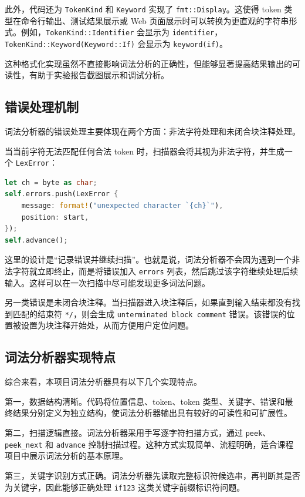 \documentclass[UTF8,a4paper,12pt]{ctexart}
\begin{document}
此外，代码还为 \texttt{TokenKind} 和 \texttt{Keyword} 实现了 \texttt{fmt::Display}。这使得 token 类型在命令行输出、测试结果展示或 Web 页面展示时可以转换为更直观的字符串形式。例如，\texttt{TokenKind::Identifier} 会显示为 \texttt{identifier}，\texttt{TokenKind::Keyword(Keyword::If)} 会显示为 \texttt{keyword(if)}。

这种格式化实现虽然不直接影响词法分析的正确性，但能够显著提高结果输出的可读性，有助于实验报告截图展示和调试分析。

\subsection{错误处理机制}

词法分析器的错误处理主要体现在两个方面：非法字符处理和未闭合块注释处理。

当当前字符无法匹配任何合法 token 时，扫描器会将其视为非法字符，并生成一个 \texttt{LexError}：

\begin{lstlisting}[language=Rust,caption={非法字符错误处理}]
let ch = byte as char;
self.errors.push(LexError {
    message: format!("unexpected character `{ch}`"),
    position: start,
});
self.advance();
\end{lstlisting}

这里的设计是“记录错误并继续扫描”。也就是说，词法分析器不会因为遇到一个非法字符就立即终止，而是将错误加入 \texttt{errors} 列表，然后跳过该字符继续处理后续输入。这样可以在一次扫描中尽可能发现更多词法问题。

另一类错误是未闭合块注释。当扫描器进入块注释后，如果直到输入结束都没有找到匹配的结束符 \texttt{*/}，则会生成 \texttt{unterminated block comment} 错误。该错误的位置被设置为块注释开始处，从而方便用户定位问题。

\subsection{词法分析器实现特点}

综合来看，本项目词法分析器具有以下几个实现特点。

第一，数据结构清晰。代码将位置信息、token、token 类型、关键字、错误和最终结果分别定义为独立结构，使词法分析器输出具有较好的可读性和可扩展性。

第二，扫描逻辑直接。词法分析器采用手写逐字符扫描方式，通过 \texttt{peek}、\texttt{peek\_next} 和 \texttt{advance} 控制扫描过程。这种方式实现简单、流程明确，适合课程项目中展示词法分析的基本原理。

第三，关键字识别方式正确。词法分析器先读取完整标识符候选串，再判断其是否为关键字，因此能够正确处理 \texttt{if123} 这类关键字前缀标识符问题。
\end{document}
